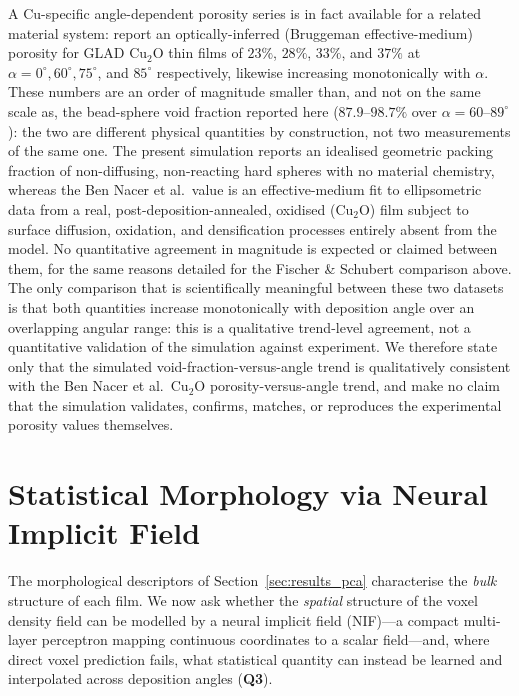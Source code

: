 \documentclass[aip,amsmath,amssymb,reprint]{revtex4-1}
\newcommand{\dang}{\ensuremath{\alpha}}
\begin{document}
A Cu-specific angle-dependent porosity series is in fact available for a
related material system: \citet{benNacer2020cu2oGlad} report an optically-inferred
(Bruggeman effective-medium) porosity for GLAD Cu$_2$O thin films of
$23\%$, $28\%$, $33\%$, and $37\%$ at $\dang = 0^{\circ}, 60^{\circ},
75^{\circ}$, and $85^{\circ}$ respectively, likewise increasing
monotonically with $\dang$.  These numbers are an order of magnitude
smaller than, and not on the same scale as, the bead-sphere void fraction
reported here ($87.9$--$98.7\%$ over $\dang = 60$--$89^{\circ}$): the two
are different physical quantities by construction, not two measurements of
the same one. The present simulation reports an idealised geometric packing
fraction of non-diffusing, non-reacting hard spheres with no material
chemistry, whereas the Ben Nacer et al.\ value is an effective-medium fit to
ellipsometric data from a real, post-deposition-annealed, oxidised
(Cu$_2$O) film subject to surface diffusion, oxidation, and densification
processes entirely absent from the model. No quantitative agreement in
magnitude is expected or claimed between them, for the same reasons
detailed for the Fischer \& Schubert comparison above.
The only comparison that is scientifically meaningful between these two
datasets is that both quantities increase monotonically with deposition
angle over an overlapping angular range: this is a qualitative
trend-level agreement, not a quantitative validation of the simulation
against experiment. We therefore state only that the simulated
void-fraction-versus-angle trend is qualitatively consistent with the
Ben Nacer et al.\ Cu$_2$O porosity-versus-angle trend, and make no claim
that the simulation validates, confirms, matches, or reproduces the
experimental porosity values themselves.

\section{Statistical Morphology via Neural Implicit Field}
\label{sec:nif}

The morphological descriptors of Section~\ref{sec:results_pca}
characterise the \textit{bulk} structure of each film.
We now ask whether the \textit{spatial} structure of the voxel density
field can be modelled by a neural implicit field (NIF)---a compact
multi-layer perceptron mapping continuous coordinates to a scalar
field---and, where direct voxel prediction fails, what statistical
quantity can instead be learned and interpolated across deposition angles
(\textbf{Q3}).
\end{document}
